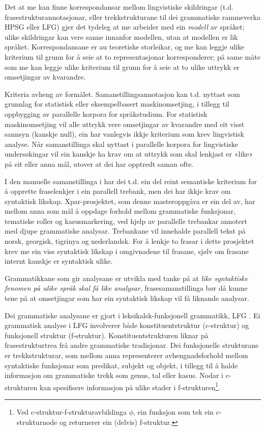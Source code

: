 \documentclass[12pt,a4paper,oneside,draft]{report}
\begin{document}
Det at me kan finne korrespondansar mellom lingvistiske skildringar
(t.d. frasestrukturannotasjonar, eller trekkstrukturane til dei
grammatiske rammeverka HPSG eller LFG) gjer det tydeleg at me arbeider
med ein \emph{modell} av språket; ulike skildringar kan vere sanne innanfor
modellen, utan at modellen er lik språket. Korrespondansane er au
teoretiske storleikar, og me kan leggje ulike kriterium til grunn for
å seie at to representasjonar korresponderer; på same måte som me kan
leggje ulike kriterium til grunn for å seie at to ulike uttrykk er
omsetjingar av kvarandre.

Kriteria avheng av formålet. Samanstillingsannotasjon kan t.d. nyttast
som grunnlag for statistisk eller eksempelbasert maskinomsetjing, i
tillegg til oppbygging av parallelle korpora for språkstudium.  For
statistisk maskinomsetjing vil alle uttrykk vere omsetjingar av
kvarandre med eit visst sannsyn (kanskje null), ein har vanlegvis
ikkje kriterium som krev lingvistisk analyse. Når samanstillinga skal
nyttast i parallelle korpora for lingvistiske undersøkingar vil ein
kanskje ha krav om at uttrykk som skal lenkjast er «like» på eit eller
anna mål, utover at dei har opptredt saman ofte.

I den manuelle samanstillinga i \citet{samuelsson2006pap} har dei
t.d. ein del reint semantiske kriterium for å opprette fraselenkjer i
ein parallell trebank, men dei har ikkje krav om syntaktisk likskap.
Xpar-prosjektet, som denne masteroppgåva er ein del av, har mellom
anna som mål å oppdage forhold mellom grammatiske funksjonar,
tematiske roller og kasusmarkering, ved hjelp av parallelle trebankar
annotert med djupe grammatiske analysar. Trebankane vil innehalde
parallell tekst på norsk, georgisk, tigrinya og nederlandsk.  For å
lenkje to frasar i dette prosjektet krev me ein viss syntaktisk
likskap i omgivnadene til frasane, sjølv om frasane internt kanskje er
syntaktisk ulike.  

Grammatikkane som gir analysane er utvikla med tanke på at \emph{like syntaktiske fenomen på ulike språk skal få like analysar},
frasesamanstillinga bør då kunne tene på at omsetjingar som har ein
syntaktisk likskap vil få liknande analysar.

Dei grammatiske analysane er gjort i leksikalsk-funksjonell
grammatikk, LFG \citep{bresnan2001lfs}. Ei grammatisk analyse i LFG
involverer både konstituentstruktur (c-struktur) og funksjonell
struktur (f-struktur). Konstituentstrukturen liknar på
frasestrukturtrea frå andre grammatiske tradisjonar. Dei funksjonelle
strukturane er trekkstrukturar, som mellom anna representerer
avhengnadsforhold mellom syntaktiske funksjonar som predikat, subjekt
og objekt, i tillegg til å halde informasjon om grammatiske trekk som
genus, tal eller kasus. Nodar i c-strukturen kan spesifisere
informasjon på ulike stader i f-strukturen\footnote{Ved c-struktur-f-strukturavbildinga $\phi$, ein funksjon som
        tek ein c-strukturnode og returnerer ein (delvis) f-struktur. }.
\end{document}
